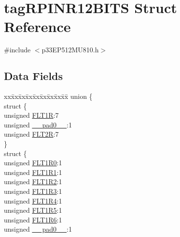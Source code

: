 \hypertarget{structtag_r_p_i_n_r12_b_i_t_s}{}\section{tag\+R\+P\+I\+N\+R12\+B\+I\+TS Struct Reference}
\label{structtag_r_p_i_n_r12_b_i_t_s}


{\ttfamily \#include $<$p33\+E\+P512\+M\+U810.\+h$>$}

\subsection*{Data Fields}
\begin{DoxyCompactItemize}
\item 
\begin{tabbing}
xx\=xx\=xx\=xx\=xx\=xx\=xx\=xx\=xx\=\kill
union \{\\
\>struct \{\\
\>\>unsigned \hyperlink{structtag_r_p_i_n_r12_b_i_t_s_a503a4037f8781aabae995885f51739b4}{FLT1R}:7\\
\>\>unsigned \hyperlink{structtag_r_p_i_n_r12_b_i_t_s_adf71f3d8410c1f1dbbc96680a92c49af}{\_\_pad0\_\_}:1\\
\>\>unsigned \hyperlink{structtag_r_p_i_n_r12_b_i_t_s_a7fbc4d2f0e2908c02f425ca8f1d4ab62}{FLT2R}:7\\
\>\} \\
\>struct \{\\
\>\>unsigned \hyperlink{structtag_r_p_i_n_r12_b_i_t_s_a1f3f2e13ed8956189667674585d80e2f}{FLT1R0}:1\\
\>\>unsigned \hyperlink{structtag_r_p_i_n_r12_b_i_t_s_a32c02fe865cfae16b88cb8fb79f74c72}{FLT1R1}:1\\
\>\>unsigned \hyperlink{structtag_r_p_i_n_r12_b_i_t_s_a25f1346bd98d662e5beec62c7e571120}{FLT1R2}:1\\
\>\>unsigned \hyperlink{structtag_r_p_i_n_r12_b_i_t_s_ad83f17ce77800e69914ceb98968712e7}{FLT1R3}:1\\
\>\>unsigned \hyperlink{structtag_r_p_i_n_r12_b_i_t_s_aad2e64882fb12f017994d28e94d954b0}{FLT1R4}:1\\
\>\>unsigned \hyperlink{structtag_r_p_i_n_r12_b_i_t_s_aaae566428cc937164041a170cb709d23}{FLT1R5}:1\\
\>\>unsigned \hyperlink{structtag_r_p_i_n_r12_b_i_t_s_a2b54a2348a8ee5e5100cd39003d3084c}{FLT1R6}:1\\
\>\>unsigned \hyperlink{structtag_r_p_i_n_r12_b_i_t_s_adf71f3d8410c1f1dbbc96680a92c49af}{\_\_pad0\_\_}:1\\

\end{tabbing}
\end{DoxyCompactItemize}
